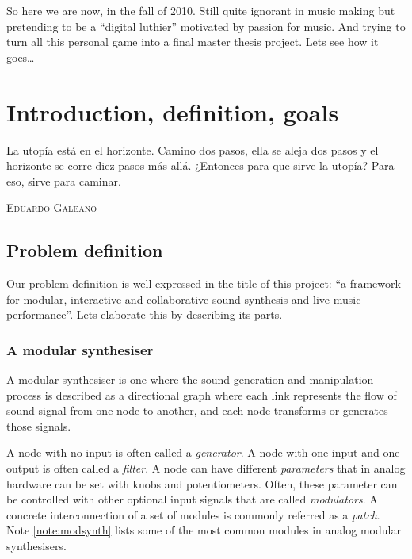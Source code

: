 So here we are now, in the fall of 2010. Still quite ignorant in music
making but pretending to be a ``digital luthier'' motivated by passion
for music. And trying to turn all this personal game into a final
master thesis project. Lets see how it goes\ldots

\chapter{Introduction, definition, goals}

\epigraph{La utopía está en el horizonte. Camino dos pasos, ella se
  aleja dos pasos y el horizonte se corre diez pasos más
  allá. ¿Entonces para que sirve la utopía? Para eso, sirve para
  caminar.}{\textsc{Eduardo Galeano}}

\section{Problem definition}

Our problem definition is well expressed in the title of this project:
``a framework for modular, interactive and collaborative sound
synthesis and live music performance''. Lets elaborate this by
describing its parts.

\subsection{A modular synthesiser}
\label{sec:defmodular}
A modular synthesiser is one where the sound generation and
manipulation process is described as a directional graph where each
link represents the flow of sound signal from one node to another, and
each node transforms or generates those signals.

A node with no input is often called a \emph{generator}. A node with
one input and one output is often called a \emph{filter}. A node can
have different \emph{parameters} that in analog hardware can be set
with knobs and potentiometers. Often, these parameter can be
controlled with other optional input signals that are called
\emph{modulators}. A concrete interconnection of a set of modules is
commonly referred as a \emph{patch}. Note \ref{note:modsynth} lists
some of the most common modules in analog modular synthesisers.

